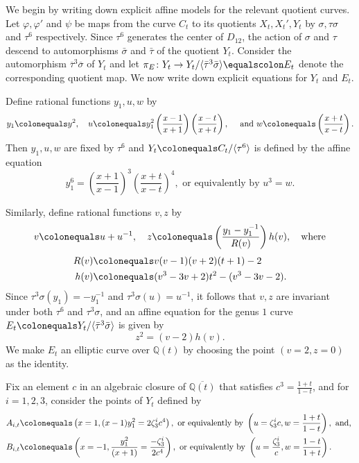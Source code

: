 \documentclass[reqno,10pt]{amsart}
\theoremstyle{definition}
\theoremstyle{definition}
\def\Q{{\mathbb Q}}
\begin{document}
We begin by writing down explicit affine models for the relevant quotient curves. Let $\varphi, \varphi'$ and $\psi$ be maps from the curve $C_t$ to its quotients $X_t,X_t',Y_t$ by $\sigma, \tau \sigma$ and $\tau^6$ respectively.  Since $\tau^6$ generates the center of $D_{12}$, the action of $\sigma$ and $\tau$ descend to automorphisms $\bar{\sigma}$ and $\bar{\tau}$ of the quotient $Y_t$. Consider the automorphism $\overline{\tau}^3 \overline{\sigma}$ of $Y_t$ and let $\pi_{E} \colon Y_t \rightarrow Y_t/\langle \bar{\tau}^3\bar{\sigma} \rangle \equalscolon E_t$ denote the corresponding quotient map. We now write down explicit equations for $Y_t$ and $E_t$.

Define rational functions $y_1,u,w$ by
\[ y_1 \colonequals y^2, \quad u \colonequals y_1^2 \left(\frac{x - 1}{x + 1}\right)\left(\frac{x - t}{x + t}\right), \quad \textup{ and }   w \colonequals \left(\frac{x+t}{x-t}\right).\]
Then $y_1,u,w$ are fixed by $\tau^6$ and $Y_t \colonequals C_t / \langle \tau^6 \rangle$ is defined by the affine equation
\[ y_1^6 = \left(\frac{x + 1}{x - 1}\right)^3
\left(\frac{x + t}{x - t}\right)^4, \text{ or equivalently by  } u^3=w. \]

Similarly, define rational functions $v,z$ by
\[ v \colonequals u+u^{-1}, \quad z \colonequals \left(\frac{y_1-y_1^{-1}}{R(v)}\right)h(v), \textup {\quad where} \] 
\begin{align*} 
R(v) &\colonequals v(v-1)(v+2)(t+1)-2 \\ h(v) &\colonequals (v^3-3v+2)t^2-(v^3-3v-2).\end{align*} 
Since $\tau^3\sigma(y_1) = -y_1^{-1}$ and $\tau^3 \sigma(u) = u^{-1}$, it follows that  $v,z$ are invariant under both $\tau^6$ and $\tau^3 \sigma$, and an affine equation for the genus $1$ curve $E_t \colonequals Y_t / \langle \bar{\tau}^3 \bar{\sigma} \rangle$ is given by
\[ z^2 = (v-2) h(v). \]
We make $E_t$ an elliptic curve over $\Q(t)$ by choosing the point $(v=2,z=0)$ as the identity. 

Fix an element $c$ in an algebraic closure of $\overline{\mathbb{Q}(t)}$ that satisfies $ c^3 = \frac{1+t}{1-t}$, and for $i=1,2,3$, consider the points of $Y_t$ defined by
\begin{align*} A_{i,t} &\colonequals \left(x=1,(x-1)y_1^2=2\zeta_3^i c^4 \right), \ \textup{or equivalently by}\ \left( u = \zeta_3^i c, w = \frac{1+t}{1-t}  \right), \textup{ and, } \\
B_{i,t} &\colonequals \left(x=-1,\frac{y_1^2}{(x+1)}=\frac{-\zeta_3^i}{2c^4} \right), \  \textup{or equivalently by}\ \left( u = \frac{\zeta_3^i}{c}, w = \frac{1-t}{1+t} \right) .\end{align*}
\end{document}
